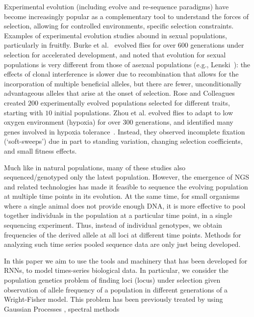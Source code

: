 Experimental evolution (including evolve and re-sequence paradigms)
have become increasingly popular as a complementary tool to understand
the forces of selection, allowing for controlled environments,
specific selection constraints. Examples of experimental evolution
studies abound in sexual populations, particularly in fruitfly. Burke
et al.~\cite{Burke2010} evolved flies for over $600$ generations under
selection for accelerated development, and noted that evolution for
sexual populations is very different from those of asexual populations
(e.g., Lenski~\cite{}): the effects of clonal interference is slower
due to recombination that allows for the incorporation of multiple
beneficial alleles, but there are fewer, unconditionally advantageous
alleles that arise at the onset of selection. Rose and
Colleagues~\cite{Rose} created $200$ experimentally evolved
populations selected for different traits, starting with $10$ initial
populations. Zhou et al. evolved flies to adapt to low oxygen
environment (hypoxia) for over $300$ generations, and identified many
genes involved in hypoxia tolerance~\cite{}.  Instead, they observed
incomplete fixation (`soft-sweeps') due in part to standing variation,
changing selection coefficients, and small fitness effects.

Much like in natural populations, many of these studies also
sequenced/genotyped only the latest population. However, the emergence
of NGS and related technologies has made it feasible to sequence the
evolving population at multiple time points in its evolution. At the
same time, for small organisms where a single animal does not provide
enough DNA, it is more effective to pool together individuals in the
population at a particular time point, in a single sequencing
experiment. Thus, instead of individual genotypes, we obtain
frequencies of the derived allele at all loci at different time
points. Methods for analyzing such time series pooled sequence data
are only just being developed.

In this paper we aim to use the tools and machinery that has been
developed for RNNs, to model times-series biological data. In
particular, we consider the population genetics problem of finding
loci (locus) under selection given observation of allele frequency of
a population in different generations of a Wright-Fisher model. This
problem has been previously treated by using Gaussian Processes
\cite{EnadR-GP}, spectral methods \cite{EandR-spectral}



